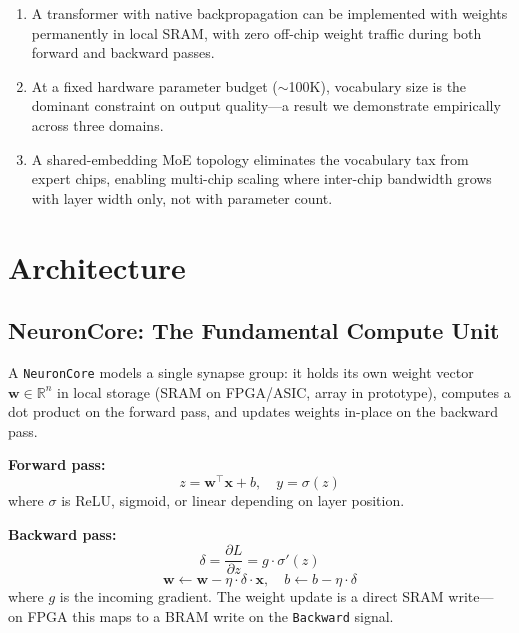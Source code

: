 \documentclass[11pt]{article}
\begin{document}
\begin{enumerate}
\item A transformer with native backpropagation can be implemented with weights
  permanently in local SRAM, with zero off-chip weight traffic during both
  forward and backward passes.

\item At a fixed hardware parameter budget ($\sim$100K), vocabulary size is the
  dominant constraint on output quality---a result we demonstrate empirically across
  three domains.

\item A shared-embedding MoE topology eliminates the vocabulary tax from expert chips,
  enabling multi-chip scaling where inter-chip bandwidth grows with layer width only,
  not with parameter count.
\end{enumerate}

\section{Architecture}

\subsection{NeuronCore: The Fundamental Compute Unit}

A \texttt{NeuronCore} models a single synapse group: it holds its own weight vector
$\mathbf{w} \in \mathbb{R}^n$ in local storage (SRAM on FPGA/ASIC, array in prototype),
computes a dot product on the forward pass, and updates weights in-place on the backward pass.

\textbf{Forward pass:}
\begin{equation}
z = \mathbf{w}^\top \mathbf{x} + b, \quad y = \sigma(z)
\end{equation}
where $\sigma$ is ReLU, sigmoid, or linear depending on layer position.

\textbf{Backward pass:}
\begin{equation}
\delta = \frac{\partial L}{\partial z} = g \cdot \sigma'(z)
\end{equation}
\begin{equation}
\mathbf{w} \leftarrow \mathbf{w} - \eta \cdot \delta \cdot \mathbf{x}, \quad
b \leftarrow b - \eta \cdot \delta
\end{equation}
where $g$ is the incoming gradient. The weight update is a direct SRAM write---
on FPGA this maps to a BRAM write on the \texttt{Backward} signal.
\end{document}
